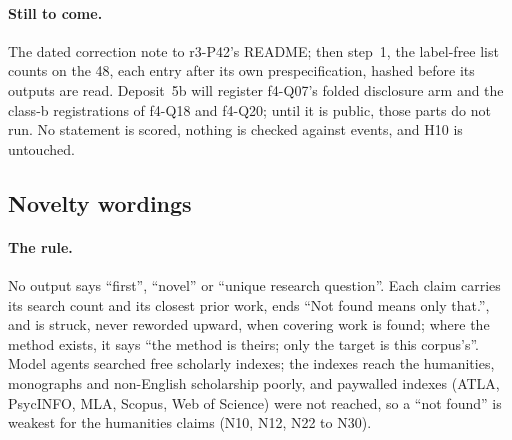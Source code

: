 \paragraph{Still to come.} The dated correction note to r3-P42's README; then step~1, the label-free list counts on the
48, each entry after its own prespecification, hashed before its outputs are read. Deposit~5b will register f4-Q07's
folded disclosure arm and the class-b registrations of f4-Q18 and f4-Q20; until it is public, those parts do not run. No
statement is scored, nothing is checked against events, and H10 is untouched.


\subsection{Novelty wordings}
\label{app:panel3-novelty}

\paragraph{The rule.} No output says ``first'', ``novel'' or ``unique research question''. Each claim carries its search
count and its closest prior work, ends ``Not found means only that.'', and is struck, never reworded upward, when
covering work is found; where the method exists, it says ``the method is theirs; only the target is this corpus's''.
Model agents searched free scholarly indexes; the indexes reach the humanities, monographs and non-English scholarship
poorly, and paywalled indexes (ATLA, PsycINFO, MLA, Scopus, Web of Science) were not reached, so a ``not found'' is
weakest for the humanities claims (N10, N12, N22 to N30).

